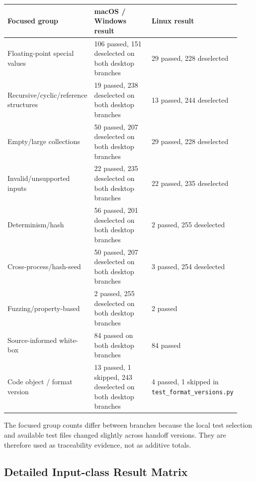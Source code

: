 \documentclass[10pt,a4paper]{article}
\begin{document}
\begin{longtable}{@{}L{0.36\linewidth}L{0.30\linewidth}L{0.27\linewidth}@{}}
\toprule
\textbf{Focused group} & \textbf{macOS / Windows result} & \textbf{Linux result} \\
\midrule

Floating-point special values &
106 passed, 151 deselected on both desktop branches &
29 passed, 228 deselected \\

Recursive/cyclic/reference structures &
19 passed, 238 deselected on both desktop branches &
13 passed, 244 deselected \\

Empty/large collections &
50 passed, 207 deselected on both desktop branches &
29 passed, 228 deselected \\

Invalid/unsupported inputs &
22 passed, 235 deselected on both desktop branches &
22 passed, 235 deselected \\

Determinism/hash &
56 passed, 201 deselected on both desktop branches &
2 passed, 255 deselected \\

Cross-process/hash-seed &
50 passed, 207 deselected on both desktop branches &
3 passed, 254 deselected \\

Fuzzing/property-based &
2 passed, 255 deselected on both desktop branches &
2 passed \\

Source-informed white-box &
84 passed on both desktop branches &
84 passed \\

Code object / format version &
13 passed, 1 skipped, 243 deselected on both desktop branches &
4 passed, 1 skipped in \texttt{test\_format\_versions.py} \\

\bottomrule
\end{longtable}
\endgroup

The focused group counts differ between branches because the local test selection and available test files changed slightly across handoff versions. They are therefore used as traceability evidence, not as additive totals.

\subsection{Detailed Input-class Result Matrix}
\end{document}
